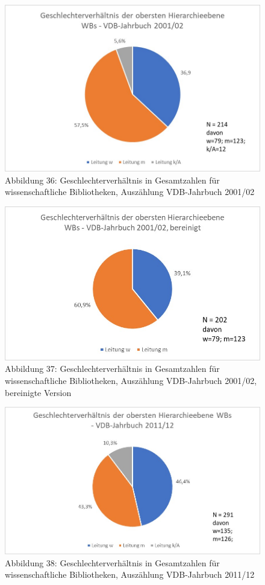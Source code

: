\documentclass[a4paper,
fontsize=11pt,
oneside,
numbers=noperiodatend,
parskip=half-,
bibliography=totoc,
final
]{scrartcl}
\begin{document}
\begin{figure}
\centering
\includegraphics{img/Abb_36_VDB-2001_gesamt.jpg}
\caption{Abbildung 36: Geschlechterverhältnis in Gesamtzahlen für
wissenschaftliche Bibliotheken, Auszählung VDB-Jahrbuch 2001/02}
\end{figure}

\begin{figure}
\centering
\includegraphics{img/Abb_37_VDB-2001_gesamt_bereinigt.jpg}
\caption{Abbildung 37: Geschlechterverhältnis in Gesamtzahlen für
wissenschaftliche Bibliotheken, Auszählung VDB-Jahrbuch 2001/02,
bereinigte Version}
\end{figure}

\begin{figure}
\centering
\includegraphics{img/Abb_38_VDB-2011_gesamt.jpg}
\caption{Abbildung 38: Geschlechterverhältnis in Gesamtzahlen für
wissenschaftliche Bibliotheken, Auszählung VDB-Jahrbuch 2011/12}
\end{figure}
\end{document}
